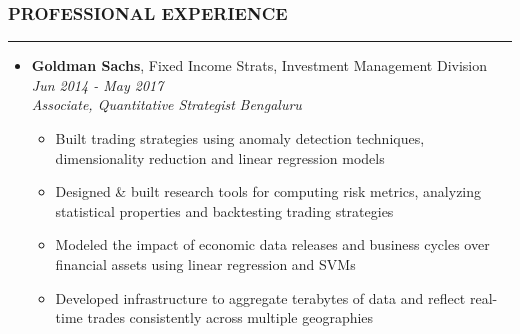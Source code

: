 \documentclass[10pt,a4paper,English]{article}
\newcommand\roottitle[1]{\vspace{-4mm}\subsubsection*{\uppercase{#1}}\vspace{-0.3em}\nopagebreak[4]\hrule\vspace{4mm}}
\newcommand\itemyear[1]{\hfill \emph{\color{itemyear} #1}}
\newcommand\itemenv{\setlength\itemsep{0.5pt} \addtolength{\itemindent}{-5mm}\vspace{-1.5mm}}
\newcommand\itemenvnoindent{\setlength\itemsep{-1pt} \vspace{-1.5mm}}
\begin{document}
\roottitle{Professional Experience}
\begin{itemize}[leftmargin=11pt] \itemenvnoindent

    \item \textbf{Goldman Sachs}, Fixed Income Strats, Investment Management Division \itemyear{Jun 2014 - May 2017} \\
    \textit{Associate, Quantitative Strategist} \itemyear{Bengaluru}
        \begin{itemize} \itemenv
            \item Built trading strategies using anomaly detection techniques, dimensionality reduction and linear regression models
            \item Designed \& built research tools for computing risk metrics, analyzing statistical properties and backtesting trading strategies
            \item Modeled the impact of economic data releases and business cycles over financial assets using linear regression and SVMs
            \item Developed infrastructure to aggregate terabytes of data and reflect real-time trades consistently across multiple geographies
        \end{itemize}
\end{itemize}

\end{document}
